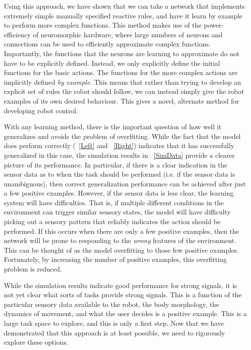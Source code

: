 \documentclass{frontiersSCNS}
\begin{document}
Using this approach, we have shown that we can take a network that
implements extremely simple manually specified reactive rules, and have
it learn by example to perform more complex functions.  This method
makes use of the power-efficiency of neuromorphic hardware, where large
numbers of neurons and connections can be used to efficiently
approximate complex functions.  Importantly, the functions that the neurons
are learning to approximate do not have to be explicitly defined.  Instead,
we only explicitly define the initial functions for the basic actions.  The
functions for the more complex actions are implicitly defined \textit{by example}.
This means that rather than trying to develop an explicit set of rules the
robot should follow, we can instead simply give the robot examples of its own desired
behaviour.  This gives a novel, alternate method for developing robot control.

With any learning method, there is the important question of how well it
generalizes and avoids the problem of overfitting.  While the fact that the
model does perform correctly (\figurename~\ref{Left} and \figurename~\ref{Right})
indicates that it has successfully generalized in this case, the simulation
results in \figurename~\ref{SimData} provide a clearer picture of its
performance.  In particular, if there is a clear indication in the sensor
data as to when the task should be performed (i.e. if the sensor data is
unambiguous), then correct generalization performance can be achieved after just a few
positive examples.  However, if the sensor data is less clear, the learning
system will have difficulties.  That is, if multiple different conditions in
the environment can trigger similar sensory states, the model will have difficulty
picking out a sensory pattern that reliably indicates the action should be
performed.  If this occurs when there are only a few positive examples, then
the network will be prone to responding to the \textit{wrong} features of
the environment.  This can be thought of as the model overfitting to those
few positive examples.  Fortunately, by increasing the number of positive
examples, this overfitting problem is reduced.

While the simulation results indicate good performance for strong signals,
it is not yet clear what sorts of tasks provide strong signals.  This is
a function of the particular sensory data available to the robot, the
body morphology, the dynamics of movement, and what the user decides is a
positive example.  This is a large task space to explore, and this is
only a first step.  Now that we have demonstrated that this approach is at
least possible, we need to rigorously explore these options.
\end{document}
